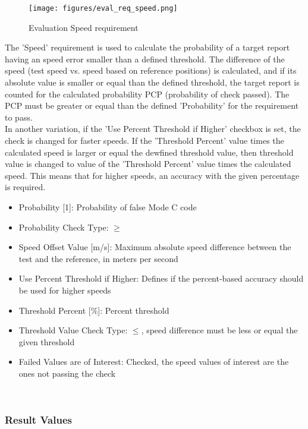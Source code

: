 \begin{figure}[H]
    \texttt{[image: figures/eval\_req\_speed.png]}
  \caption{Evaluation Speed requirement}
\end{figure}

The 'Speed' requirement is used to calculate the probability of a target report having an speed error smaller than a defined threshold. The difference of the speed (test speed vs. speed based on reference positions) is calculated, and if its absolute value is smaller or equal than the defined threshold, the target report is counted for the calculated probability PCP (probability of check passed). The PCP must be greater or equal than the defined 'Probability' for the requirement to pass. \\

In another variation, if the 'Use Percent Threshold if Higher' checkbox is set, the check is changed for faster speeds. If the 'Threshold Percent' value times the calculated speed is larger or equal the dewfined threshold value, then threshold value is changed to value of the 'Threshold Percent' value times the calculated speed. This means that for higher speeds, an accuracy with the given percentage is required. \\

\begin{itemize}  
\item Probability [1]: Probability of false Mode C code
\item Probability Check Type: $\geq$
\item Speed Offset Value [m/s]: Maximum absolute speed difference between the test and the reference, in meters per second
\item Use Percent Threshold if Higher: Defines if the percent-based accuracy should be used for higher speeds
\item Threshold Percent [\%]: Percent threshold
\item Threshold Value Check Type: $\leq$, speed difference must be less or equal the given threshold
\item Failed Values are of Interest: Checked, the speed values of interest are the ones not passing the check
\end{itemize}
\ \\

\subsubsection{Result Values}

